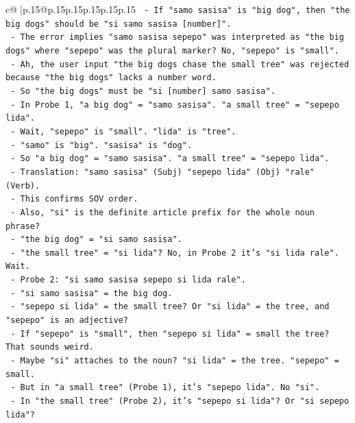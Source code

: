 \documentclass{article}
\begin{document}
{\begin{supertabular}{c@{$\;$}|p{.15\linewidth}@{}p{.15\linewidth}p{.15\linewidth}p{.15\linewidth}p{.15\linewidth}p{.15\linewidth}}
{{{\texttt{           {-} If "samo sasisa" is "big dog", then "the big dogs" should be "si samo sasisa {[}number{]}".} \\
\texttt{           {-} The error implies "samo sasisa sepepo" was interpreted as "the big dogs" where "sepepo" was the plural marker? No, "sepepo" is "small".} \\
\texttt{           {-} Ah, the user input "the big dogs chase the small tree" was rejected because "the big dogs" lacks a number word.} \\
\texttt{           {-} So "the big dogs" must be "si {[}number{]} samo sasisa".} \\
\texttt{           {-} In Probe 1, "a big dog" = "samo sasisa". "a small tree" = "sepepo lida".} \\
\texttt{           {-} Wait, "sepepo" is "small". "lida" is "tree".} \\
\texttt{           {-} "samo" is "big". "sasisa" is "dog".} \\
\texttt{           {-} So "a big dog" = "samo sasisa". "a small tree" = "sepepo lida".} \\
\texttt{           {-} Translation: "samo sasisa" (Subj) "sepepo lida" (Obj) "rale" (Verb).} \\
\texttt{           {-} This confirms SOV order.} \\
\texttt{           {-} Also, "si" is the definite article prefix for the whole noun phrase?} \\
\texttt{             {-} "the big dog" = "si samo sasisa".} \\
\texttt{             {-} "the small tree" = "si lida"? No, in Probe 2 it's "si lida rale". Wait.} \\
\texttt{             {-} Probe 2: "si samo sasisa sepepo si lida rale".} \\
\texttt{             {-} "si samo sasisa" = the big dog.} \\
\texttt{             {-} "sepepo si lida" = the small tree? Or "si lida" = the tree, and "sepepo" is an adjective?} \\
\texttt{             {-} If "sepepo" is "small", then "sepepo si lida" = small the tree? That sounds weird.} \\
\texttt{             {-} Maybe "si" attaches to the noun? "si lida" = the tree. "sepepo" = small.} \\
\texttt{             {-} But in "a small tree" (Probe 1), it's "sepepo lida". No "si".} \\
\texttt{             {-} In "the small tree" (Probe 2), it's "sepepo si lida"? Or "si sepepo lida"?} \\
}}}
\end{supertabular}}
\end{document}

